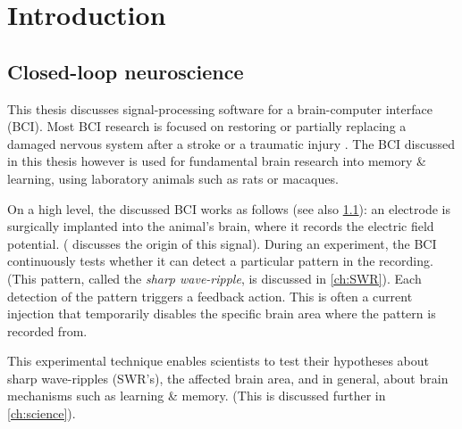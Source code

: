 \chapter{Introduction}



\section{Closed-loop neuroscience}
\label{sec:BCI}

This thesis discusses signal-processing software for a brain-computer interface (BCI).\footnotemark{} Most BCI research is focused on restoring or partially replacing a damaged nervous system after a stroke or a traumatic injury \cite{Krucoff2016}. The BCI discussed in this thesis however is used for fundamental brain research into memory \& learning, using laboratory animals such as rats or macaques.


On a high level, the discussed BCI works as follows (see also \cref{fig:closed-loop}): an electrode is surgically implanted into the animal's brain, where it records the electric field potential. ( discusses the origin of this signal). During an experiment, the BCI continuously tests whether it can detect a particular pattern in the recording. (This pattern, called the \emph{sharp wave-ripple}, is discussed in \cref{ch:SWR}). Each detection of the pattern triggers a feedback action. This is often a current injection that temporarily disables the specific brain area where the pattern is recorded from.

This experimental technique enables scientists to test their hypotheses about sharp wave-ripples (SWR's), the affected brain area, and in general, about brain mechanisms such as learning \& memory. (This is discussed further in \cref{ch:science}).


\begin{figure}
\label{fig:closed-loop}
\end{figure}



